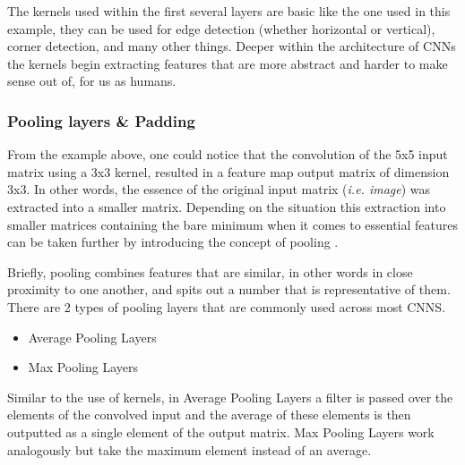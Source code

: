 The kernels used within the first several layers are basic like the one used in this example, they can be used for edge detection (whether horizontal or vertical), corner detection, and many other things. Deeper within the architecture of CNNs the kernels begin extracting features that are more abstract and harder to make sense out of, for us as humans.

\subsubsection{Pooling layers \& Padding}
From the example above, one could notice that the convolution of the 5x5 input matrix using a 3x3 kernel, resulted in a feature map output matrix of dimension 3x3. In other words, the essence of the original input matrix (\textit{i.e. image}) was extracted into a smaller matrix. Depending on the situation this extraction into smaller matrices containing the bare minimum when it comes to essential features can be taken further by introducing the concept of pooling \cite{lecun2015deep}.

Briefly, pooling combines features that are similar, in other words in close proximity to one another, and spits out a number that is representative of them. There are 2 types of pooling layers that are commonly used across most CNNS.

\begin{itemize}
    \item Average Pooling Layers
    \item Max Pooling Layers
\end{itemize}

Similar to the use of kernels, in Average Pooling Layers a filter is passed over the elements of the convolved input and the average of these elements is then outputted as a single element of the output matrix. Max Pooling Layers work analogously but take the maximum element instead of an average.

